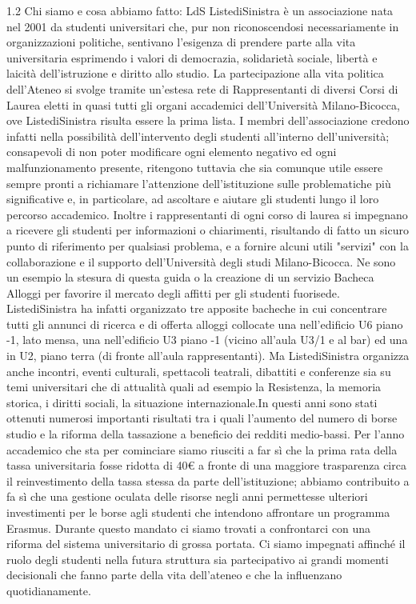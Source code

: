 1.2 Chi siamo e cosa abbiamo fatto: LdS
ListediSinistra è un associazione nata nel 2001 da studenti universitari che, pur non riconoscendosi necessariamente in organizzazioni politiche, sentivano l'esigenza di prendere parte alla vita universitaria esprimendo i valori di democrazia, solidarietà sociale, libertà e laicità dell'istruzione e diritto allo studio.
La partecipazione alla vita politica dell'Ateneo si svolge tramite un'estesa rete di Rappresentanti di diversi Corsi di Laurea eletti in quasi tutti gli organi accademici dell'Università Milano-Bicocca, ove ListediSinistra risulta essere la prima lista.
I membri dell'associazione credono infatti nella possibilità dell'intervento degli studenti all'interno dell'università; consapevoli di non poter modificare ogni elemento negativo ed ogni malfunzionamento presente, ritengono tuttavia che sia comunque utile essere sempre pronti a richiamare l'attenzione dell'istituzione sulle problematiche più significative e, in particolare, ad ascoltare e aiutare gli studenti lungo il loro percorso accademico.
Inoltre i rappresentanti di ogni corso di laurea si impegnano a ricevere gli studenti per informazioni o chiarimenti, risultando di fatto un sicuro punto di riferimento per qualsiasi problema, e a fornire alcuni utili "servizi" con la collaborazione e il supporto dell'Università degli studi Milano-Bicocca.
Ne sono un esempio la stesura di questa guida o la creazione di un servizio Bacheca Alloggi per favorire il mercato degli affitti per gli studenti fuorisede.
ListediSinistra ha infatti organizzato tre apposite bacheche in cui concentrare tutti gli annunci di ricerca e di offerta alloggi collocate una nell'edificio U6 piano -1, lato mensa, una nell'edificio U3 piano -1 (vicino all'aula U3/1 e al bar) ed una in U2, piano terra (di fronte all’aula rappresentanti).
Ma ListediSinistra organizza anche incontri, eventi culturali, spettacoli teatrali, dibattiti e conferenze sia su temi universitari che di attualità quali ad esempio la Resistenza, la memoria storica, i diritti sociali, la situazione internazionale.In questi anni sono stati ottenuti numerosi importanti risultati tra i quali l'aumento del numero di borse studio e la riforma della tassazione a beneficio dei redditi medio-bassi. Per l'anno accademico che sta per cominciare siamo riusciti a far sì che la prima rata della tassa universitaria fosse ridotta di 40€ a fronte di una maggiore trasparenza circa il reinvestimento della tassa stessa da parte dell'istituzione; abbiamo contribuito a fa sì che una gestione oculata delle risorse negli anni permettesse ulteriori investimenti per le borse agli studenti che intendono affrontare un programma Erasmus. Durante questo mandato ci siamo trovati a confrontarci con una riforma del sistema universitario di grossa portata. Ci siamo impegnati affinché il ruolo degli studenti nella futura struttura sia partecipativo ai grandi momenti decisionali che fanno parte della vita dell'ateneo e che la influenzano quotidianamente.

